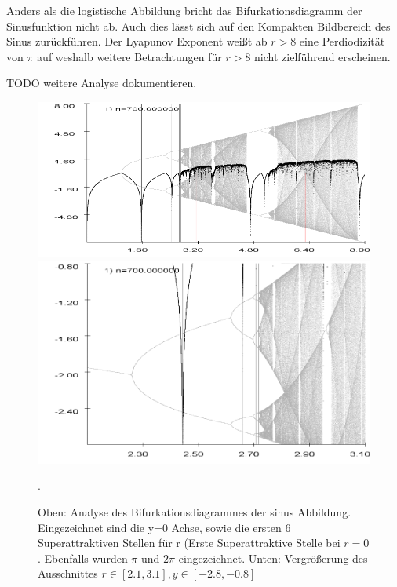 \documentclass{scrartcl}
\begin{document}
Anders als die logistische Abbildung bricht das Bifurkationsdiagramm der Sinusfunktion nicht ab. Auch dies lässt sich auf den Kompakten Bildbereich des Sinus zurückführen. Der Lyapunov Exponent weißt ab $r>8$ eine Perdiodizität von $\pi$ auf weshalb weitere Betrachtungen für $r>8$ nicht zielführend erscheinen.

TODO weitere Analyse dokumentieren.

\begin{figure}
\centering
\includegraphics[scale=0.55]{bifurkation-sin}
\includegraphics[scale=0.47]{bifurkation-sin-zoom}
\caption{Oben: Analyse des Bifurkationsdiagrammes der sinus Abbildung. Eingezeichnet sind die y=0 Achse, sowie die ersten 6 Superattraktiven Stellen für r (Erste Superattraktive Stelle bei $r=0$. Ebenfalls wurden $\pi$ und $2\pi$ eingezeichnet. Unten: Vergrößerung des Ausschnittes $r \in [2.1,3.1], y\in[-2.8,-0.8]$}. 
\label{fig:bifurc-sin}
\end{figure}

 
\end{document}
